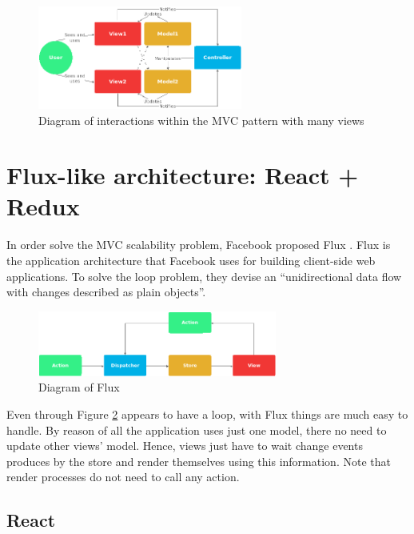 \begin{figure}[htb]
	\begin{center}
		\includegraphics[width=0.6\textwidth]{./figures/mvc-complex.png}
		\caption{Diagram of interactions within the MVC pattern with many views}
		\label{F:mvc-complex}
	\end{center}
\end{figure}

\section{Flux-like architecture: React + Redux}

In order solve the MVC scalability problem, Facebook proposed Flux
\cite{flux-web}. Flux is the application architecture that Facebook uses for
building client-side web applications. To solve the loop problem, they devise
an “unidirectional data flow with changes described as plain objects”.

\begin{figure}[htb]
	\begin{center}
		\includegraphics[width=0.7\textwidth]{./figures/flux.png}
		\caption{Diagram of Flux}
		\label{F:flux}
	\end{center}
\end{figure}

Even through Figure \ref{F:flux} appears to have a loop, with Flux things are
much easy to handle. By reason of all the application uses just one model,
there no need to update other views' model. Hence, views just have to wait
change events produces by the store and render themselves using this 
information. Note that render processes do not need to call any action.

\subsection{React}

